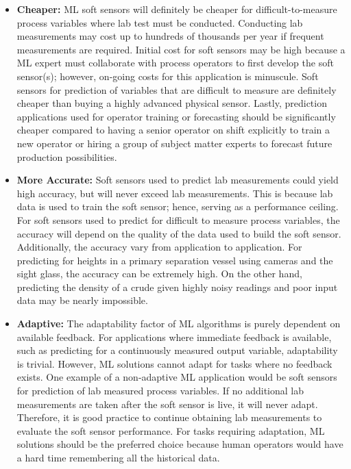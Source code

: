 \begin{itemize}
    \item \textbf{Cheaper: } ML soft sensors will definitely be cheaper for difficult-to-measure process variables where lab test must be conducted.  Conducting lab measurements may cost up to hundreds of thousands per year if frequent measurements are required.  Initial cost for soft sensors may be high because a ML expert must collaborate with process operators to first develop the soft sensor(s); however, on-going costs for this application is minuscule.  Soft sensors for prediction of variables that are difficult to measure are definitely cheaper than buying a highly advanced physical sensor.  Lastly, prediction applications used for operator training or forecasting should be significantly cheaper compared to having a senior operator on shift explicitly to train a new operator or hiring a group of subject matter experts to forecast future production possibilities.
    \item \textbf{More Accurate: } Soft sensors used to predict lab measurements could yield high accuracy, but will never exceed lab measurements.  This is because lab data is used to train the soft sensor; hence, serving as a performance ceiling.  For soft sensors used to predict for difficult to measure process variables, the accuracy will depend on the quality of the data used to build the soft sensor.  Additionally, the accuracy vary from application to application.  For predicting for heights in a primary separation vessel using cameras and the sight glass, the accuracy can be extremely high.  On the other hand, predicting the density of a crude given highly noisy readings and poor input data may be nearly impossible.
    \item \textbf{Adaptive: } The adaptability factor of ML algorithms is purely dependent on available feedback.  For applications where immediate feedback is available, such as predicting for a continuously measured output variable, adaptability is trivial.  However, ML solutions cannot adapt for tasks where no feedback exists.  One example of a non-adaptive ML application would be soft sensors for prediction of lab measured process variables. If no additional lab measurements are taken after the soft sensor is live, it will never adapt.  Therefore, it is good practice to continue obtaining lab measurements to evaluate the soft sensor performance. For tasks requiring adaptation, ML solutions should be the preferred choice because human operators would have a hard time remembering all the historical data.
\end{itemize}

